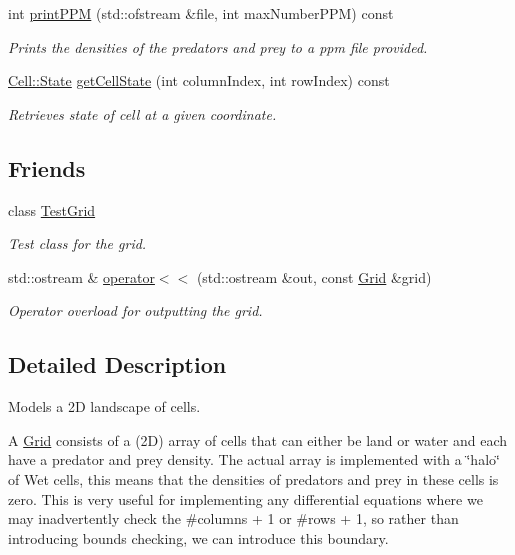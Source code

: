 \begin{DoxyCompactItemize}
$$int \hyperlink{class_grid_acf89a88b063c4f641ad1331bcf9447ad}{print\+P\+PM} (std\+::ofstream \&file, int max\+Number\+P\+PM) const
\begin{DoxyCompactList}\small\item\em Prints the densities of the predators and prey to a ppm file provided. \end{DoxyCompactList}\item 
\hyperlink{class_cell_a21d74a2efcb79c93e5649b06a50b7cf5}{Cell\+::\+State} \hyperlink{class_grid_a425801f2747d6be34c10eb6535ab0829}{get\+Cell\+State} (int column\+Index, int row\+Index) const
\begin{DoxyCompactList}\small\item\em Retrieves state of cell at a given coordinate. \end{DoxyCompactList}\end{DoxyCompactItemize}
\subsection*{Friends}
\begin{DoxyCompactItemize}
\item 
class \hyperlink{class_grid_ac2cfb15a02d10acf2c124625070a2de8}{Test\+Grid}
\begin{DoxyCompactList}\small\item\em Test class for the grid. \end{DoxyCompactList}\item 
std\+::ostream \& \hyperlink{class_grid_a3513576c9cced69b185e4be8fe248e8c}{operator$<$$<$} (std\+::ostream \&out, const \hyperlink{class_grid}{Grid} \&grid)
\begin{DoxyCompactList}\small\item\em Operator overload for outputting the grid. \end{DoxyCompactList}\end{DoxyCompactItemize}


\subsection{Detailed Description}
Models a 2D landscape of cells. 

A \hyperlink{class_grid}{Grid} consists of a (2D) array of cells that can either be land or water and each have a predator and prey density. The actual array is implemented with a \char`\"{}halo\char`\"{} of Wet cells, this means that the densities of predators and prey in these cells is zero. This is very useful for implementing any differential equations where we may inadvertently check the \#columns + 1 or \#rows + 1, so rather than introducing bounds checking, we can introduce this boundary. 

